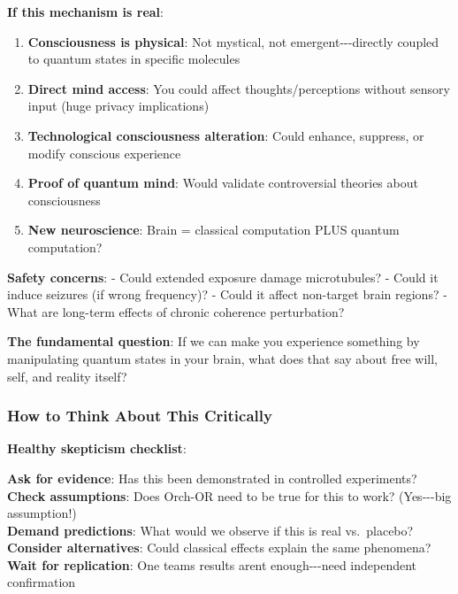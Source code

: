 \textbf{If this mechanism is real}:

\begin{enumerate}
\def\labelenumi{\arabic{enumi}.}
\tightlist
\item
  \textbf{Consciousness is physical}: Not mystical, not
  emergent-\/-\/-directly coupled to quantum states in specific
  molecules
\item
  \textbf{Direct mind access}: You could affect thoughts/perceptions
  without sensory input (huge privacy implications)
\item
  \textbf{Technological consciousness alteration}: Could enhance,
  suppress, or modify conscious experience
\item
  \textbf{Proof of quantum mind}: Would validate controversial theories
  about consciousness
\item
  \textbf{New neuroscience}: Brain = classical computation PLUS quantum
  computation?
\end{enumerate}

\textbf{Safety concerns}: - Could extended exposure damage microtubules?
- Could it induce seizures (if wrong frequency)? - Could it affect
non-target brain regions? - What are long-term effects of chronic
coherence perturbation?

\textbf{The fundamental question}: If we can make you experience
something by manipulating quantum states in your brain, what does that
say about free will, self, and reality itself?

\subsubsection{How to Think About This
Critically}\label{how-to-think-about-this-critically}

\textbf{Healthy skepticism checklist}:

\textbf{Ask for evidence}: Has this been demonstrated in controlled
experiments?\\
\textbf{Check assumptions}: Does Orch-OR need to be true for this to
work? (Yes-\/-\/-big assumption!)\\
\textbf{Demand predictions}: What would we observe if this is real
vs.~placebo?\\
\textbf{Consider alternatives}: Could classical effects explain the same
phenomena?\\
\textbf{Wait for replication}: One team\textquotesingle s results
aren\textquotesingle t enough-\/-\/-need independent confirmation

